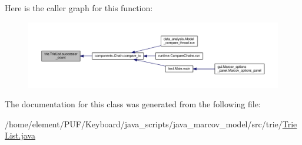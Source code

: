 Here is the caller graph for this function\+:\nopagebreak
\begin{figure}[H]
\begin{center}
\leavevmode
\includegraphics[width=350pt]{classtrie_1_1_trie_list_a42644a837b91c05c2db9a106bd02e30d_icgraph}
\end{center}
\end{figure}




The documentation for this class was generated from the following file\+:\begin{DoxyCompactItemize}
\item 
/home/element/\+P\+U\+F/\+Keyboard/java\+\_\+scripts/java\+\_\+marcov\+\_\+model/src/trie/\hyperlink{_trie_list_8java}{Trie\+List.\+java}\end{DoxyCompactItemize}
